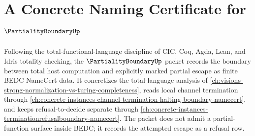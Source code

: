 \chapter{A Concrete Naming Certificate for $\PartialityBoundaryUp$}
\label{ch:concrete-instances-partiality-boundary-namecert}

Following the total-functional-language discipline of CIC, Coq, Agda, Lean, and Idris totality checking, the $\PartialityBoundaryUp$ packet records the boundary between total host computation and explicitly marked partial escape as finite BEDC NameCert data. It concretizes the total-language analysis of \autoref{ch:visions-strong-normalization-vs-turing-completeness}, reads local channel termination through \autoref{ch:concrete-instances-channel-termination-halting-boundary-namecert}, and keeps refusal-to-decide separate through \autoref{ch:concrete-instances-terminationrefusalboundary-namecert}. The packet does not admit a partial-function surface inside BEDC; it records the attempted escape as a refusal row.

